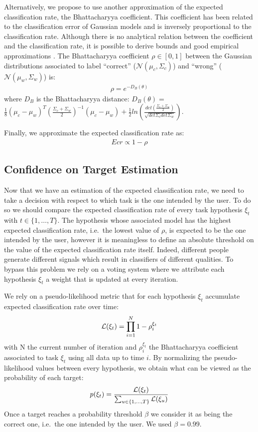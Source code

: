 Alternatively, we propose to use another approximation of the expected classification rate, the Bhattacharyya coefficient. This coefficient has been related to the classification error of Gaussian models \cite{Kailath67} and is inversely proportional to the classification rate. Although there is no analytical relation between the coefficient and the classification rate, it is possible to derive bounds and good empirical approximations \cite{lee2000bayes}.
%
The Bhattacharyya coefficient $\rho \in [0,1]$ between the Gaussian distributions associated to label ``correct'' ($\mathcal{N}(\mu_c, \Sigma_c)$) and ``wrong'' ($\mathcal{N}(\mu_w, \Sigma_w)$) is:
%
\begin{eqnarray}
\rho = e^{-D_B(\theta)}
\end{eqnarray}
%
where $D_B$ is the Bhattacharyya distance:
$D_B(\theta)=$\\$\frac{1}{8}(\mu_c-\mu_w)^T(\frac{\Sigma_c+\Sigma_w}{2})^{-1}(\mu_c-\mu_w)+\frac{1}{2}ln\left(\frac{det(\frac{\Sigma_c+\Sigma_w}{2})}{\sqrt{det\Sigma_c det\Sigma_w}}\right)$. 

Finally, we approximate the expected classification rate as: 
\begin{eqnarray}
Ecr \propto 1 - \rho
\end{eqnarray}


\subsection{Confidence on Target Estimation}

Now that we have an estimation of the expected classification rate, we need to take a decision with respect to which task is the one intended by the user. To do so we should compare the expected classification rate of every task hypothesis $\xi_t$ with $t \in \{1, \ldots, T\}$. The hypothesis whose associated model has the highest expected classification rate, i.e.\ the lowest value of $\rho$, is expected to be the one intended by the user, however it is meaningless to define an absolute threshold on the value of the expected classification rate itself. Indeed, different people generate different signals which result in classifiers of different qualities. To bypass this problem we rely on a voting system where we attribute each hypothesis $\xi_t$ a weight that is updated at every iteration.

We rely on a pseudo-likelihood metric that for each hypothesis $\xi_t$ accumulate expected classification rate over time:
%
\begin{eqnarray}
\mathcal{L}(\xi_t) = \prod_{i = 1}^{N} 1 - \rho_i^{\xi_t}
\end{eqnarray}
%
with N the current number of iteration and $\rho_i^{\xi_t}$ the Bhattacharyya coefficient associated to task $\xi_t$ using all data up to time $i$. By normalizing the pseudo-likelihood values between every hypothesis, we obtain what can be viewed as the probability of each target:
%
\begin{eqnarray}
p(\xi_t) = \frac{\mathcal{L}(\xi_t)}{\sum_{u \in \{1, \ldots, T\}} \mathcal{L}(\xi_u)}
\end{eqnarray}
%
Once a target reaches a probability threshold $\beta$ we consider it as being the correct one, i.e.\ the one intended by the user. We used $\beta = 0.99$.


